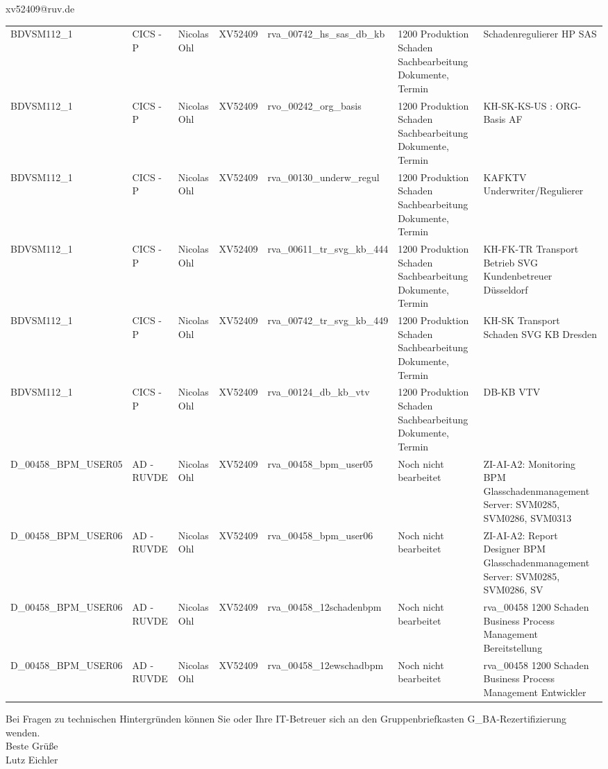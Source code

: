 \documentclass[a4paper,landscape,12pt]{letter}
\begin{document}
\begin{letter}{xv52409@ruv.de\hfill \break}
\begin{tiny}
\begin{longtable}{|p{35mm}|p{15mm}|p{25mm}|p{10mm}|p{40mm}|p{50mm}|p{50mm}|}
BDVSM112\_1 & CICS - P & Nicolas Ohl & XV52409 & rva\_00742\_hs\_sas\_db\_kb & 1200 Produktion Schaden Sachbearbeitung Dokumente, Termin & Schadenregulierer HP SAS \\
BDVSM112\_1 & CICS - P & Nicolas Ohl & XV52409 & rvo\_00242\_org\_basis & 1200 Produktion Schaden Sachbearbeitung Dokumente, Termin & KH-SK-KS-US : ORG-Basis AF \\
BDVSM112\_1 & CICS - P & Nicolas Ohl & XV52409 & rva\_00130\_underw\_regul & 1200 Produktion Schaden Sachbearbeitung Dokumente, Termin & KAFKTV Underwriter/Regulierer \\
BDVSM112\_1 & CICS - P & Nicolas Ohl & XV52409 & rva\_00611\_tr\_svg\_kb\_444 & 1200 Produktion Schaden Sachbearbeitung Dokumente, Termin & KH-FK-TR Transport Betrieb SVG  Kundenbetreuer Düsseldorf \\
BDVSM112\_1 & CICS - P & Nicolas Ohl & XV52409 & rva\_00742\_tr\_svg\_kb\_449 & 1200 Produktion Schaden Sachbearbeitung Dokumente, Termin & KH-SK Transport Schaden SVG KB Dresden \\
BDVSM112\_1 & CICS - P & Nicolas Ohl & XV52409 & rva\_00124\_db\_kb\_vtv & 1200 Produktion Schaden Sachbearbeitung Dokumente, Termin & DB-KB VTV \\
D\_00458\_BPM\_USER05 & AD - RUVDE & Nicolas Ohl & XV52409 & rva\_00458\_bpm\_user05 & Noch nicht bearbeitet & ZI-AI-A2: Monitoring BPM Glasschadenmanagement Server: SVM0285, SVM0286, SVM0313 \\
D\_00458\_BPM\_USER06 & AD - RUVDE & Nicolas Ohl & XV52409 & rva\_00458\_bpm\_user06 & Noch nicht bearbeitet & ZI-AI-A2: Report Designer BPM Glasschadenmanagement Server: SVM0285, SVM0286, SV \\
D\_00458\_BPM\_USER06 & AD - RUVDE & Nicolas Ohl & XV52409 & rva\_00458\_12schadenbpm & Noch nicht bearbeitet & rva\_00458 1200 Schaden  Business Process Management Bereitstellung \\
D\_00458\_BPM\_USER06 & AD - RUVDE & Nicolas Ohl & XV52409 & rva\_00458\_12ewschadbpm & Noch nicht bearbeitet & rva\_00458 1200 Schaden Business Process Management Entwickler \\

\hline
		\end{longtable}
		\end{tiny}
	
\begin{minipage}{\textwidth}
			Bei Fragen zu technischen Hintergründen können Sie 
			oder Ihre IT-Betreuer sich an den Gruppenbriefkasten 
			G\_BA-Rezertifizierung
			wenden.\\
			\linebreak
			Beste Grüße\\
			Lutz Eichler
	\end{minipage}
	\end{letter}
	
\end{document}
